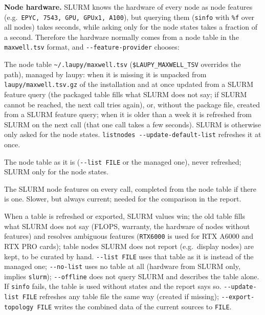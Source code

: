 \documentclass[11pt,a4paper]{article}
\newcommand{\cmd}[1]{\texttt{#1}}
\begin{document}
\begin{description}[style=nextline,leftmargin=1.5em]
    \textbf{Node hardware.} SLURM knows the hardware of every node as node features (e.g.\
    \cmd{EPYC, 7543, GPU, GPUx1, A100}), but querying them (\cmd{sinfo} with \cmd{\%f} over all
    nodes) takes seconds, while asking only for the node states takes a fraction of a second.
    Therefore the hardware normally comes from a node table in the \cmd{maxwell.tsv} format, and
    \cmd{-{}-feature-provider} chooses:
    \begin{description}[style=nextline,leftmargin=1.5em,itemsep=2pt]
      \item[\cmd{app-managed-list} (default)] The node table \cmd{\textasciitilde/.laupy/maxwell.tsv}
        (\cmd{\$LAUPY\_MAXWELL\_TSV} overrides the path), managed by laupy: when it is missing it is
        unpacked from \cmd{laupy/maxwell.tsv.gz} of the installation and at once updated from a
        SLURM feature query (the packaged table fills what SLURM does not say; if SLURM cannot be
        reached, the next call tries again), or, without the package file, created from a SLURM
        feature query; when it is older than a week it is refreshed from SLURM on the
        next call (that one call takes a few seconds). SLURM is otherwise only asked for the node
        states. \cmd{listnodes -{}-update-default-list} refreshes it at once.
      \item[\cmd{list}] The node table as it is (\cmd{-{}-list FILE} or the managed one), never
        refreshed; SLURM only for the node states.
      \item[\cmd{slurm}] The SLURM node features on every call, completed from the node table if
        there is one. Slower, but always current; needed for the comparison in the report.
    \end{description}
    When a table is refreshed or exported, SLURM values win; the old table fills what SLURM does not
    say (FLOPS, warranty, the hardware of nodes without features) and resolves ambiguous features
    (\cmd{RTX6000} is used for RTX A6000 and RTX PRO cards); table nodes SLURM does not report (e.g.\
    display nodes) are kept, to be curated by hand. \cmd{-{}-list FILE} uses that table as it is
    instead of the managed one; \cmd{-{}-no-list} uses no table at all (hardware from SLURM only,
    implies \cmd{slurm}); \cmd{-{}-offline} does not query SLURM and describes the table alone. If
    \cmd{sinfo} fails, the table is used without states and the report says so.
    \cmd{-{}-update-list FILE} refreshes any table file the same way (created if missing);
    \cmd{-{}-export-topology FILE} writes the combined data of the current sources to \cmd{FILE}.


\end{description}
\end{document}
